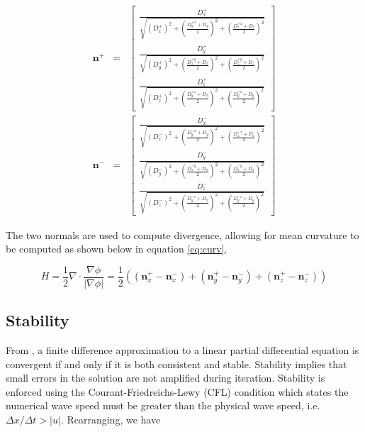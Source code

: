 \begin{eqnarray}
\textbf{n}^+ &=& \left[
  \begin{array}{ c }
     \frac{D_x^+}{\sqrt{(D_x^+)^2 + {\left(\frac{D_y^{+x}+D_y}{2}\right)}^2 +{\left(\frac{D_z^{+x}+D_z}{2}\right)}^2  }}  \\[2em]
     \frac{D_y^+}{\sqrt{(D_y^+)^2 + {\left(\frac{D_x^{+y}+D_x}{2}\right)}^2 +{\left(\frac{D_z^{+y}+D_z}{2}\right)}^2  }}  \\[2em]
     \frac{D_z^+}{\sqrt{(D_z^+)^2 + {\left(\frac{D_y^{+z}+D_x}{2}\right)}^2 +{\left(\frac{D_y^{+z}+D_y}{2}\right)}^2  }}  
  \end{array} \right] \\[2em]
\textbf{n}^- &=& \left[
  \begin{array}{ c }
     \frac{D_x^-}{\sqrt{(D_x^-)^2 + {\left(\frac{D_y^{-x}+D_y}{2}\right)}^2 +{\left(\frac{D_z^{-x}+D_z}{2}\right)}^2  }}  \\[2em]
     \frac{D_y^-}{\sqrt{(D_y^-)^2 + {\left(\frac{D_x^{-y}+D_x}{2}\right)}^2 +{\left(\frac{D_z^{-y}+D_z}{2}\right)}^2  }}  \\[2em]
     \frac{D_z^-}{\sqrt{(D_z^-)^2 + {\left(\frac{D_y^{-z}+D_x}{2}\right)}^2 +{\left(\frac{D_y^{-z}+D_y}{2}\right)}^2  }}  
  \end{array} \right] 
\label{eq:n}
\end{eqnarray}

The two normals are used to compute divergence, allowing for mean curvature to be computed as shown below in equation \eqref{eq:curv}.

\begin{equation}
H = \frac{1}{2}\nabla\cdot\frac{\nabla\phi}{|\nabla\phi|} = \frac{1}{2}((\textbf{n}_x^+ - \textbf{n}_x^-)+(\textbf{n}_y^+ - \textbf{n}_y^-)+(\textbf{n}_z^+ - \textbf{n}_z^-))
\label{eq:curv}
\end{equation}

\subsection{Stability}\label{stability}
From \cite{osher2003lsm}, a finite difference approximation to a linear partial differential equation is convergent if and only if it is both consistent and stable. Stability implies that small errors in the solution are not amplified during iteration. Stability is enforced using the Courant-Friedreichs-Lewy (CFL) condition which states the numerical wave speed must be greater than the physical wave speed, i.e. $\Delta x/\Delta t>|u|$. Rearranging, we have

